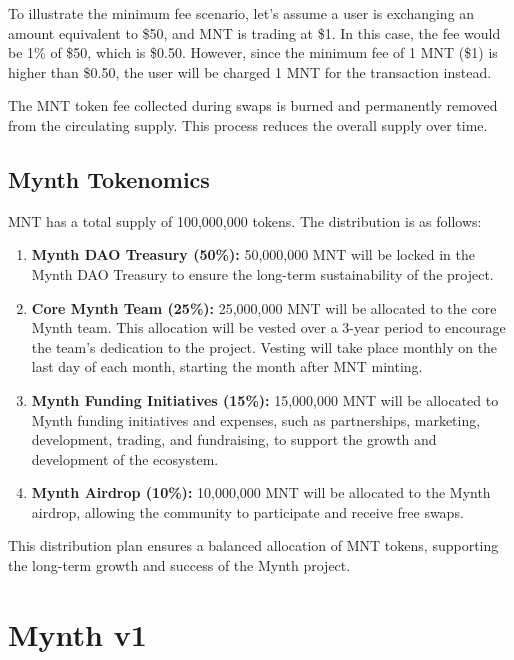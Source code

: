 To illustrate the minimum fee scenario, let's assume a user is
exchanging an amount equivalent to \$50, and MNT is trading at \$1. In
this case, the fee would be 1\% of \$50, which is \$0.50. However, since
the minimum fee of 1 MNT (\$1) is higher than \$0.50, the user will be
charged 1 MNT for the transaction instead.

The MNT token fee collected during swaps is burned and permanently
removed from the circulating supply. This process reduces the overall
supply over time.

\hypertarget{mynth-tokenomics}{%
\subsection{Mynth Tokenomics}\label{mynth-tokenomics}}

MNT has a total supply of 100,000,000 tokens. The distribution is as
follows:

\begin{enumerate}
\item
  \textbf{Mynth DAO Treasury (50\%):} 50,000,000 MNT will be locked in
  the Mynth DAO Treasury to ensure the long-term sustainability of the
  project.
\item
  \textbf{Core Mynth Team (25\%):} 25,000,000 MNT will be allocated to
  the core Mynth team. This allocation will be vested over a 3-year
  period to encourage the team's dedication to the project. Vesting will
  take place monthly on the last day of each month, starting the month
  after MNT minting.
\item
  \textbf{Mynth Funding Initiatives (15\%):} 15,000,000 MNT will be
  allocated to Mynth funding initiatives and expenses, such as
  partnerships, marketing, development, trading, and fundraising, to
  support the growth and development of the ecosystem.
\item
  \textbf{Mynth Airdrop (10\%):} 10,000,000 MNT will be allocated to the
  Mynth airdrop, allowing the community to participate and receive free
  swaps.
\end{enumerate}

This distribution plan ensures a balanced allocation of MNT tokens,
supporting the long-term growth and success of the Mynth project.

\hypertarget{mynth-v1}{%
\section{Mynth v1}\label{mynth-v1}}

